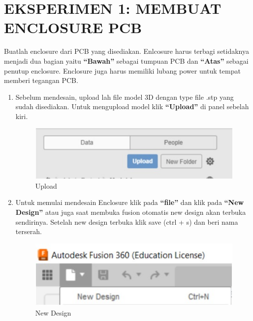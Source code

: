 \section*{\normalfont EKSPERIMEN 1: MEMBUAT ENCLOSURE PCB}
Buatlah enclosure dari PCB yang disediakan. Enlcosure harus terbagi setidaknya menjadi dua bagian yaitu
\textbf{“Bawah”} sebagai tumpuan PCB dan \textbf{“Atas”} sebagai penutup enclosure. Enclosure juga harus memiliki
lubang power untuk tempat memberi tegangan PCB.

\begin{enumerate}
    \item Sebelum mendesain, upload lah file model 3D dengan type file .stp yang sudah disediakan. Untuk
    mengupload model klik \textbf{“Upload”} di panel sebelah kiri.
        \begin{figure}[H]
            \centering
            \includegraphics[width=0.5\linewidth]{P3/img/image3.jpg}
            \caption{Upload}
            \label{fig:Upload}
        \end{figure}

    \item Untuk memulai mendesain Enclosure klik pada \textbf{“file”} dan klik pada \textbf{“New Design”} atau juga saat
    membuka fusion otomatis new design akan terbuka sendirinya. Setelah new design terbuka klik
    save (ctrl + s) dan beri nama terserah.
        \begin{figure}[H]
            \centering
            \includegraphics[width=0.5\linewidth]{P3/img/image4.jpg}
            \caption{New Design}
            \label{fig:New Design}
        \end{figure}


\end{enumerate}
